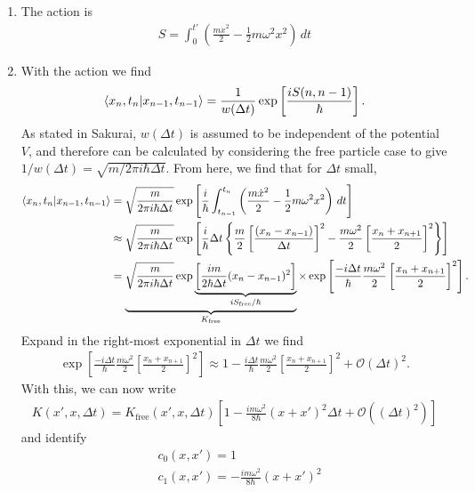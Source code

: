 \documentclass{article}
\theoremstyle{definition}
\newcommand{\f}[2]{\frac{#1}{#2}}
\newcommand{\lp}{\left(}
\newcommand{\rp}{\right)}
\newcommand{\lb}{\left[}
\newcommand{\rb}{\right]}
\newcommand{\lc}{\left\{}
\newcommand{\rc}{\right\}}
\begin{document}
\begin{enumerate}[label=(\alph*)]
	\item The action is 
	\begin{align*}
	S = \int_0^{t'} \lp \f{m \dot x^2}{2} - \f{1}{2}m\omega^2 x^2  \rp\,dt
	\end{align*}
	
	\item With the action we find 
	\begin{align*}
	\bra{x_{n},t_n}\ket{x_{n-1},t_{n-1}} = \f{1}{w(\Delta t) } \exp\lb \f{iS(n,n-1)}{\hbar} \rb.
	\end{align*}
	As stated in Sakurai, $w(\Delta t)$ is assumed to be independent of the potential $V$, and therefore can be calculated by considering the free particle case to give $1/w(\Delta t) = \sqrt{m/2\pi i \hbar \Delta t}$. From here, we find that for $\Delta t$ small, 
	\begin{align*}
	\bra{x_{n},t_n}\ket{x_{n-1},t_{n-1}} 
	&= \sqrt{\f{m}{2\pi i \hbar \Delta t}} \exp\lb \f{i}{\hbar}  \int_{t_{n-1}}^{t_n} \lp \f{m \dot x^2}{2} - \f{1}{2}m\omega^2 x^2  \rp\,dt \rb \\
	&\approx \sqrt{\f{m}{2\pi i \hbar \Delta t}} \exp\lb \f{i}{\hbar}  
	\Delta t \lc \f{m}{2}\lb \f{(x_n - x_{n-1})}{\Delta t} \rb^2 - \f{m\omega^2}{2}\lb \f{x_n + x_{n+1}}{2} \rb^2 \rc \rb \\
	&= \underbrace{\sqrt{\f{m}{2\pi i \hbar \Delta t}} 
	\exp  \underbrace{\lb\f{im}{2\hbar\Delta t }(x_n - x_{n-1})^2\rb}_{iS_\text{free}/\hbar}}_{K_\text{free}} \times \exp\lb \f{-i\Delta t}{\hbar} \f{m\omega^2}{2} \lb\f{x_n + x_{n+1}}{2} \rb^2\rb.
	\end{align*}
	Expand in the right-most exponential in $\Delta t$ we find 
	\begin{align*}
	\exp\lb \f{-i\Delta t}{\hbar} \f{m\omega^2}{2} \lb\f{x_n + x_{n+1}}{2} \rb^2\rb 
	\approx 
	1 - \f{i\Delta t}{\hbar} \f{m\omega^2}{2} \lb\f{x_n + x_{n+1}}{2} \rb^2 + \mathcal{O}{(\Delta t)^2}.
	\end{align*}
	With this, we can now write
	\begin{align*}
	K(x',x,\Delta t) = K_\text{free} (x',x,\Delta t) \lb 1 -   \f{i m\omega^2}{8\hbar} (x + x')^2\Delta t + \mathcal{O}((\Delta t)^2)\rb
	\end{align*}
	and identify
	\begin{align*}
	&c_0(x,x') = 1 \\
	&c_1(x,x') = -   \f{i m\omega^2}{8\hbar} (x + x')^2
	\end{align*}
	

\end{enumerate}
\end{document}
